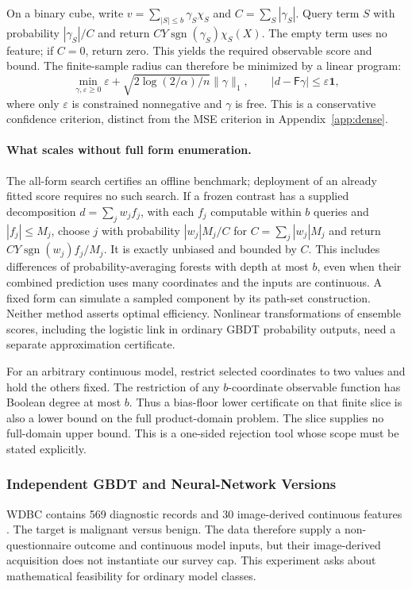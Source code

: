 On a binary cube, write $v=\sum_{|S|\le b}\gamma_S\chi_S$ and
$C=\sum_S|\gamma_S|$. Query term $S$ with probability $|\gamma_S|/C$ and
return $CY\operatorname{sgn}(\gamma_S)\chi_S(X)$. The empty term uses no
feature; if $C=0$, return zero. This yields the required observable score and bound. The
finite-sample radius can therefore be minimized by a linear program:
\[
 \min_{\gamma,\varepsilon\ge0}
 \varepsilon+\sqrt{2\log(2/\alpha)/n}\|\gamma\|_1,
 \qquad |d-\mathsf F\gamma|\le\varepsilon\mathbf1,
\]
where only $\varepsilon$ is constrained nonnegative and $\gamma$ is free.
This is a conservative confidence criterion, distinct from the MSE
criterion in Appendix~\ref{app:dense}.

\paragraph{What scales without full form enumeration.}
The all-form search certifies an offline benchmark; deployment of an
already fitted score requires no such search. If a frozen contrast has
a supplied decomposition $d=\sum_j w_j f_j$, with each $f_j$ computable
within $b$ queries and $|f_j|\le M_j$, choose $j$ with probability
$|w_j|M_j/C$ for $C=\sum_j|w_j|M_j$ and return
$CY\operatorname{sgn}(w_j)f_j/M_j$.
It is exactly unbiased and bounded by $C$. This includes differences of
probability-averaging forests with depth at most $b$, even when their
combined prediction uses many coordinates and the inputs are continuous.
A fixed form can simulate a sampled component by its path-set construction.
Neither method asserts optimal efficiency. Nonlinear transformations of
ensemble scores, including the logistic link in ordinary GBDT probability
outputs, need a separate approximation certificate.

For an arbitrary continuous model, restrict selected coordinates to two
values and hold the others fixed. The restriction of any $b$-coordinate
observable function has Boolean degree at most $b$. Thus a bias-floor
lower certificate on that finite slice is also a lower bound on the full
product-domain problem. The slice supplies no full-domain upper bound.
This is a one-sided rejection tool whose scope must be stated explicitly.

\subsubsection{Independent GBDT and Neural-Network Versions}\label{app:nonlinear}
WDBC contains 569 diagnostic records and 30 image-derived continuous
features \citep{wolberg1993}. The target is malignant versus benign.
The data therefore supply a non-questionnaire outcome and continuous
model inputs, but their image-derived acquisition does not instantiate
our survey cap. This experiment asks about mathematical feasibility for
ordinary model classes.

